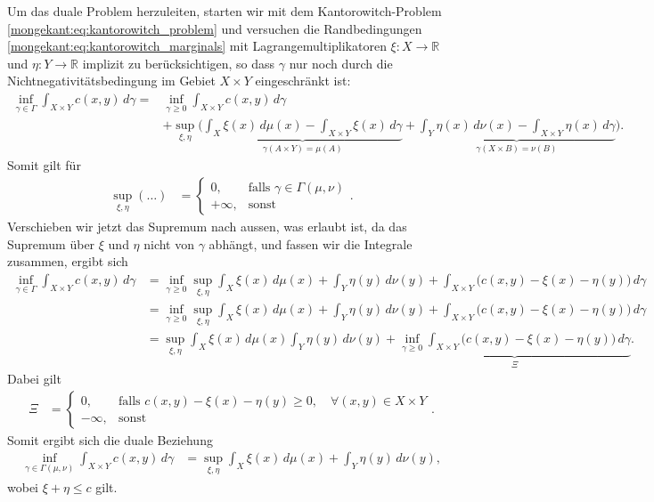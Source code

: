 Um das duale Problem herzuleiten,
starten wir mit dem Kantorowitch-Problem \eqref{mongekant:eq:kantorowitch_problem}
und versuchen die Randbedingungen \eqref{mongekant:eq:kantorowitch_marginals}
mit Lagrangemultiplikatoren $\xi \colon X \to \mathbb{R}$ und
$\eta \colon Y \to \mathbb{R}$ implizit zu berücksichtigen,
so dass $\gamma$ nur noch durch die Nichtnegativitätsbedingung im Gebiet $X\times Y$
eingeschränkt ist:
\begin{align*}
\inf_{\gamma \in \Gamma}
\int_{X \times Y} c(x,y)\, d\gamma
=&
\inf_{\gamma \geq 0}
\int_{X \times Y} c(x,y)\, d\gamma
\\
 & + \sup_{\xi, \eta} \Biggl(
\underbrace{
\int_X \xi(x)\, d\mu(x) - \int_{X \times Y} \xi(x)\, d\gamma
}_{\gamma(A \times Y) = \mu(A)}
+
\underbrace{
\int_Y \eta(x)\, d\nu(x) - \int_{X \times Y} \eta(x)\, d\gamma
}_{\gamma(X \times B) = \nu(B)}
\Biggr)
.
\end{align*}
Somit gilt für
\begin{align*}
\sup_{\xi, \eta} (\ldots)
&=
\begin{cases}
0,
& \text{falls } \gamma \in \Gamma(\mu, \nu) \\
+\infty,
& \text{sonst}
\end{cases}
.
\end{align*}
Verschieben wir jetzt das Supremum nach aussen,
was erlaubt ist,
da das Supremum über $\xi$ und $\eta$ nicht von $\gamma$ abhängt,
und fassen wir die Integrale zusammen,
ergibt sich
\begin{align*}
\inf_{\gamma \in \Gamma}
\int_{X \times Y} c(x,y)\, d\gamma
&=
\inf_{\gamma \geq 0}
\sup_{\xi, \eta}
\int_X \xi(x)\, d\mu(x)
+ \int_Y \eta(y)\, d\nu(y)
+ \int_{X \times Y} \bigl(c(x,y) - \xi(x) - \eta(y)\bigr)\, d\gamma
\\
&=
\inf_{\gamma \geq 0}
\sup_{\xi, \eta}
\int_X \xi(x)\, d\mu(x)
+ \int_Y \eta(y)\, d\nu(y)
+ \int_{X \times Y} \bigl(c(x,y) - \xi(x) - \eta(y)\bigr)\, d\gamma
\\
&=
\sup_{\xi, \eta}
\int_X \xi(x)\, d\mu(x)
\int_Y \eta(y)\, d\nu(y)
+ \underbrace{
\inf_{\gamma \geq 0} \int_{X \times Y} \bigl(c(x,y) - \xi(x) - \eta(y)\bigr)\, d\gamma
}_{\Xi}
.
\end{align*}
Dabei gilt
\begin{align*}
\Xi
&=
\begin{cases}
0,
& \text{falls } c(x,y) - \xi(x) - \eta(y) \geq 0
,\quad\forall (x,y) \in X \times Y
\\
-\infty,
& \text{sonst}
\end{cases}
.
\end{align*}
Somit ergibt sich die duale Beziehung
\begin{align}
\inf_{\gamma \in \Gamma(\mu, \nu)}
\int_{X \times Y} c(x,y)\, d\gamma
&=
\sup_{\xi, \eta}
\int_X \xi(x)\, d\mu(x)
+ \int_Y \eta(y)\, d\nu(y)
,
\label{mongekant:eq:kantorowitch_dual}
\end{align}
wobei $\xi + \eta \leq c$ gilt.

